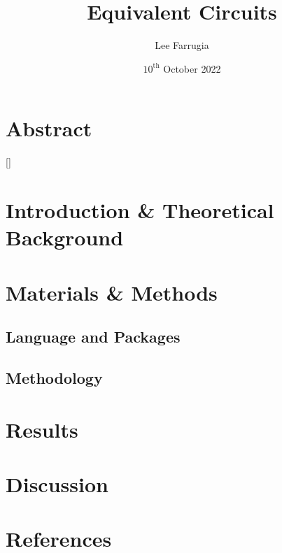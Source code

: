 \documentclass[12pt, a4paper]{article}
\title{Equivalent Circuits}
\date{\(10^\mathrm{{th}}\) October 2022}
\author{Lee Farrugia}
\begin{document}
    
\maketitle
\thispagestyle{titlepagestyle}
\pagestyle{mystyle}

\begin{multicols}{2}
\section{Abstract}
[]

\section{Introduction \& Theoretical Background}

\section{Materials \& Methods}
\subsection{Language and Packages}

\subsection{Methodology}

\section{Results}

\section{Discussion}

\section{References}
\end{multicols}
\end{document}
